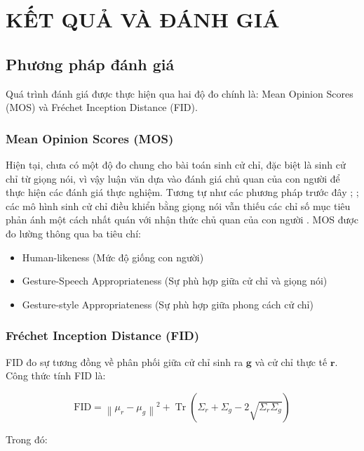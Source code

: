 
\chapter{KẾT QUẢ VÀ ĐÁNH GIÁ}
\label{chap:evalution}

\section{Phương pháp đánh giá}

Quá trình đánh giá được thực hiện qua hai độ đo chính là: Mean Opinion Scores (MOS) và Fréchet Inception Distance (FID).

\subsection{Mean Opinion Scores (MOS)}

Hiện tại, chưa có một độ đo chung cho bài toán sinh cử chỉ, đặc biệt là sinh cử chỉ từ giọng nói, vì vậy luận văn dựa vào đánh giá chủ quan của con người để thực hiện các đánh giá thực nghiệm. 
Tương tự như các phương pháp trước đây \cite{yoon2022genea}; \cite{kucherenko2021large}; các mô hình sinh cử chỉ điều khiển bằng giọng nói vẫn thiếu các chỉ số mục tiêu phản ánh một cách nhất quán với nhận thức chủ quan của con người  \cite{alexanderson2022listen}.
MOS được đo lường thông qua ba tiêu chí:

\begin{itemize}
	\item Human-likeness (Mức độ giống con người)
	\item Gesture-Speech Appropriateness (Sự phù hợp giữa cử chỉ và giọng nói)
	\item Gesture-style Appropriateness (Sự phù hợp giữa phong cách cử chỉ)
\end{itemize}


\subsection{Fréchet Inception Distance (FID)}
FID đo sự tương đồng về phân phối giữa cử chỉ sinh ra $\mathbf{g}$ và cử chỉ thực tế $\mathbf{r}$. Công thức tính FID là:

\begin{equation}
	\text{FID} = \left\| \mu_r - \mu_g \right\|^2 + \operatorname{Tr}\left( \Sigma_r + \Sigma_g - 2 \sqrt{\Sigma_r \Sigma_g} \right)
	\label{eq:fidscore}
\end{equation}


Trong đó:

